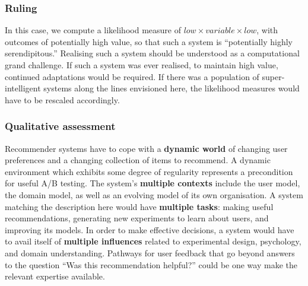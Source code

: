 \subsubsection{Ruling}

In this case, we compute a likelihood measure of
$\mathit{low}\times\mathit{variable}\times\mathit{low}$, with outcomes
of potentially high value, so that such a system is ``potentially
highly serendipitous.''  Realising such a system should be understood
as a computational grand challenge.  If such a system was ever
realised, to maintain high value, continued adaptations would be
required.  If there was a population of super-intelligent systems
along the lines envisioned here, the likelihood measures would have to
be rescaled accordingly.

\subsubsection{Qualitative assessment}

Recommender systems have to cope with a \textbf{dynamic world} of changing user preferences and a changing collection of items to recommend.  A dynamic environment which exhibits some degree of regularity represents a precondition for useful A/B testing.  The system's \textbf{multiple contexts} include the user model, the domain model, as well as an evolving model of its own organisation.  A system matching the description here would have \textbf{multiple tasks}: making useful recommendations, generating new experiments to learn about users, and improving its models.  In order to make effective decisions, a system would have to avail itself of \textbf{multiple influences} related to experimental design, psychology, and domain understanding.  Pathways for user feedback that go beyond answers to the question ``Was this recommendation helpful?'' could be one way make the relevant expertise available.


